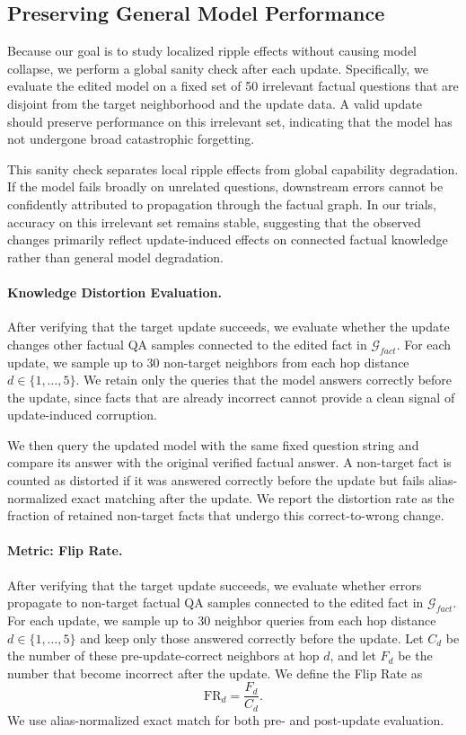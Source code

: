 \subsection{Preserving General Model Performance}

Because our goal is to study localized ripple effects without causing model collapse, we perform a global sanity check after each update. Specifically, we evaluate the edited model on a fixed set of 50 irrelevant factual questions that are disjoint from the target neighborhood and the update data. A valid update should preserve performance on this irrelevant set, indicating that the model has not undergone broad catastrophic forgetting.

This sanity check separates local ripple effects from global capability degradation. If the model fails broadly on unrelated questions, downstream errors cannot be confidently attributed to propagation through the factual graph. In our trials, accuracy on this irrelevant set remains stable, suggesting that the observed changes primarily reflect update-induced effects on connected factual knowledge rather than general model degradation.


\paragraph{Knowledge Distortion Evaluation.}
After verifying that the target update succeeds, we evaluate whether the update changes other factual QA samples connected to the edited fact in $\mathcal{G}_{fact}$. For each update, we sample up to 30 non-target neighbors from each hop distance $d\in\{1,\ldots,5\}$. We retain only the queries that the model answers correctly before the update, since facts that are already incorrect cannot provide a clean signal of update-induced corruption.

We then query the updated model with the same fixed question string and compare its answer with the original verified factual answer. A non-target fact is counted as distorted if it was answered correctly before the update but fails alias-normalized exact matching after the update. We report the distortion rate as the fraction of retained non-target facts that undergo this correct-to-wrong change.



\paragraph{Metric: Flip Rate.}
After verifying that the target update succeeds, we evaluate whether errors propagate to non-target factual QA samples connected to the edited fact in $\mathcal{G}_{fact}$. For each update, we sample up to 30 neighbor queries from each hop distance $d\in\{1,\ldots,5\}$ and keep only those answered correctly before the update. Let $C_d$ be the number of these pre-update-correct neighbors at hop $d$, and let $F_d$ be the number that become incorrect after the update. We define the Flip Rate as
\begin{equation}
    \mathrm{FR}_d = \frac{F_d}{C_d}.
    \label{eq:flip_rate}
\end{equation}
We use alias-normalized exact match for both pre- and post-update evaluation.
